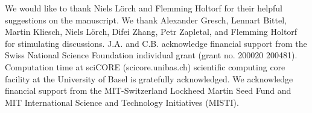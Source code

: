 \documentclass[twocolumn,aps,prl,superscriptaddress,tightlines,nofootinbib]{revtex4-2}
\begin{document}
\indent We would like to thank Niels Lörch and Flemming Holtorf for their helpful suggestions on the manuscript. We thank Alexander Gresch, Lennart Bittel, Martin Kliesch, Niels Lörch, Difei Zhang, Petr Zapletal, and Flemming Holtorf for stimulating discussions. J.A. and C.B. acknowledge financial support from the Swiss National Science Foundation individual grant (grant no. 200020 200481). Computation time at sciCORE (scicore.unibas.ch) scientific computing core facility at the University of Basel is gratefully acknowledged. We acknowledge financial support from the MIT-Switzerland Lockheed Martin Seed Fund and MIT International Science and Technology Initiatives (MISTI). 


\newpage
\pagebreak


\end{document}
